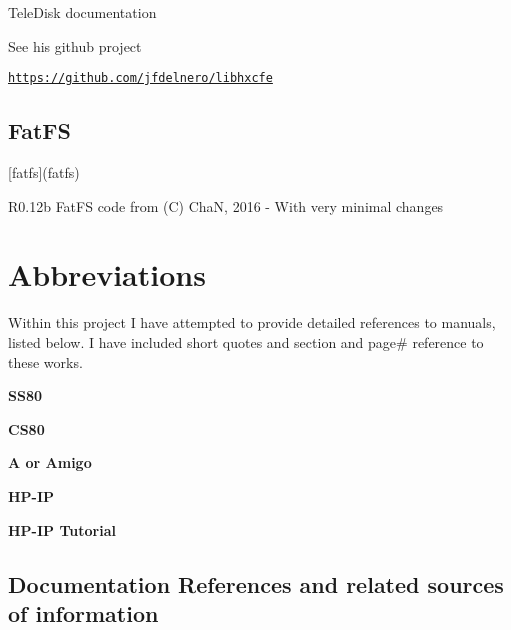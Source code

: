 \begin{DoxyItemize}
\begin{DoxyItemize}
\begin{DoxyItemize}
\begin{DoxyItemize}
\begin{DoxyItemize}
\begin{DoxyItemize}
\item Tele\+Disk documentation
\end{DoxyItemize}
\item See his github project
\begin{DoxyItemize}
\item \href{https://github.com/jfdelnero/libhxcfe}{\tt https\+://github.\+com/jfdelnero/libhxcfe}
\end{DoxyItemize}
\end{DoxyItemize}
\end{DoxyItemize}
\end{DoxyItemize}
\end{DoxyItemize}
\end{DoxyItemize}

\subsection*{Fat\+FS}


\begin{DoxyItemize}
\item \mbox{[}fatfs\mbox{]}(fatfs)
\begin{DoxyItemize}
\item R0.\+12b Fat\+FS code from (C) ChaN, 2016 -\/ With very minimal changes 


\end{DoxyItemize}
\end{DoxyItemize}

\section*{Abbreviations}

Within this project I have attempted to provide detailed references to manuals, listed below. I have included short quotes and section and page\# reference to these works.
\begin{DoxyItemize}
\item {\bfseries S\+S80}
\item {\bfseries C\+S80}
\item {\bfseries A or Amigo}
\item {\bfseries H\+P-\/\+IP}
\item {\bfseries H\+P-\/\+IP Tutorial}
\end{DoxyItemize}



 \subsection*{Documentation References and related sources of information}


